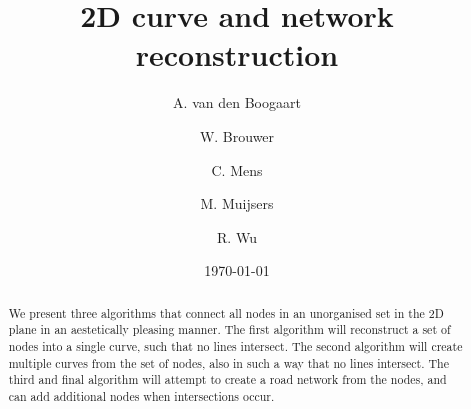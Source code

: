 \documentclass[11pt]{article}
\title{2D curve and network reconstruction}
\author{
A. van den Boogaart \and
W. Brouwer \and
C. Mens \and
M. Muijsers \and
R. Wu
}
\date{\today}
\begin{document}
\newpage

\maketitle

\begin{abstract}
We present three algorithms that connect all nodes in an unorganised set in the 2D plane in an aestetically pleasing manner. 
The first algorithm will reconstruct a set of nodes into a single curve, such that no lines intersect. 
The second algorithm will create multiple curves from the set of nodes, also in such a way that no lines intersect. 
The third and final algorithm will attempt to create a road network from the nodes, and can add additional nodes when intersections occur.\\

\end{abstract}
\end{document}
